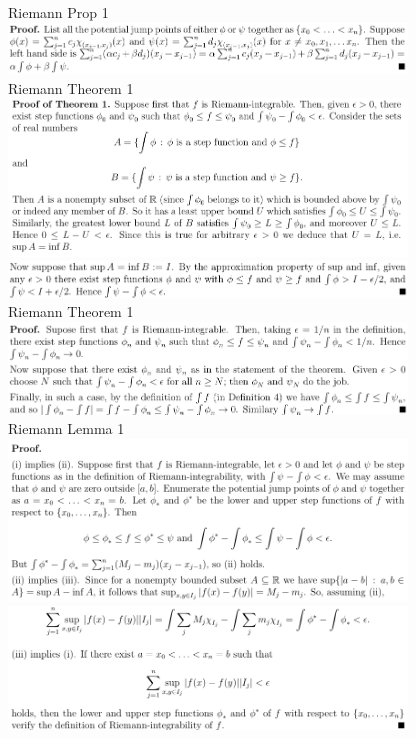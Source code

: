 \documentclass[3pt,landscape]{article}
\begin{document}
\begin{multicols}{2}
    Riemann Prop 1
    \includegraphics[width=400]{R_p1.png} \\
    Riemann Theorem 1
    \includegraphics[width=400]{R_t1a.png} \\
    \includegraphics[width=400]{R_t1b.png} \\
    Riemann Theorem 1
    \includegraphics[width=400]{R_t2.png} \\
    Riemann Lemma 1
    \includegraphics[width=400]{R_l1a.png} \\
    \includegraphics[width=400]{R_l1b.png} \\

\end{multicols}
\end{document}
